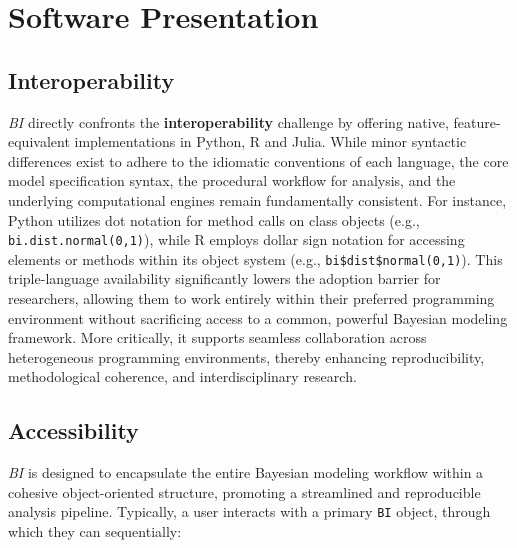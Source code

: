 \documentclass[blind,lineno,num-refs]{wiley-article}
\begin{document}
\section{Software Presentation}\label{software-presentation}
\subsection{Interoperability}\label{Interoperability}
\textit{BI} directly confronts the \textbf{interoperability} challenge by offering native, feature-equivalent implementations in Python, R and Julia. While minor syntactic differences exist to adhere to the idiomatic conventions of each language, the core model specification syntax, the procedural workflow for analysis, and the underlying computational engines remain fundamentally consistent. For instance, Python utilizes dot notation for method calls on class objects (e.g., \texttt{bi.dist.normal(0,1)}), while R employs dollar sign notation for accessing elements or methods within its object system (e.g., \texttt{bi\$dist\$normal(0,1)}). This triple-language availability significantly lowers the adoption barrier for researchers, allowing them to work entirely within their preferred programming environment without sacrificing access to a common, powerful Bayesian modeling framework. More critically, it supports seamless collaboration across heterogeneous programming environments, thereby enhancing reproducibility, methodological coherence, and interdisciplinary research.

\subsection{Accessibility}\label{Accessibility}
\textit{BI} is designed to encapsulate the entire Bayesian modeling workflow within a cohesive object-oriented structure, promoting a streamlined and reproducible analysis pipeline. Typically, a user interacts with a primary \texttt{BI} object, through which they can sequentially:
\end{document}
